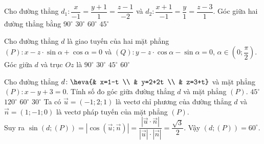 \begin{ex}%
	Cho đường thẳng $d_1\colon \dfrac{x}{-1}=\dfrac{y+1}{1}=\dfrac{z-1}{-2}$ và $d_2\colon \dfrac{x+1}{-1}=\dfrac{y}{1}=\dfrac{z-3}{1}$. Góc giữa hai đường thẳng bằng
	\choice
	{\True $90^\circ$}
	{$30^\circ$}
	{$60^\circ$}
	{$45^\circ$}
\end{ex}

\begin{ex}
	Cho đường thẳng $d$ là giao tuyến của hai mặt phẳng\\ $(P) \colon x-z \cdot \sin \alpha +\cos \alpha =0$ và $(Q) \colon y-z \cdot \cos \alpha -\sin \alpha =0$, $\alpha \in \left(0;\dfrac{\pi}{2}\right)$. Góc giữa $d$ và trục $Oz$ là
	\choice
	{$90^{\circ}$}
	{$30^{\circ}$}
	{\True $45^{\circ}$}
	{$60^{\circ}$}
\end{ex}

\begin{ex}%
	Cho đường thẳng $d\colon \heva{& x=1-t \\ & y=2+2t \\ & z=3+t}$ và mặt phẳng $(P)\colon x-y+3=0$. Tính số đo góc giữa đường thẳng $d$ và mặt phẳng $(P)$.
	\choice
	{$45^\circ$}
	{$120^\circ$}
	{\True $60^\circ$}
	{$30^\circ$}
	\loigiai
	{
		Ta có $\vec {u}=(-1;2;1)$ là vectơ chỉ phương của đường thẳng $d$ và $\vec{n}=(1;-1;0)$ là vectơ pháp tuyến của mặt phẳng $(P)$.\\
		Suy ra $\sin \left(d;(P)\right)=\left|\cos \left(\vec{u};\vec{n}\right)\right|=\dfrac{\left|\vec{u} \cdot \vec{n}\right|}{|\vec{u}|\cdot |\vec{n}|}=\dfrac{\sqrt{3}}{2}$. Vậy $(d;(P))=60^\circ$.
	}
\end{ex}

